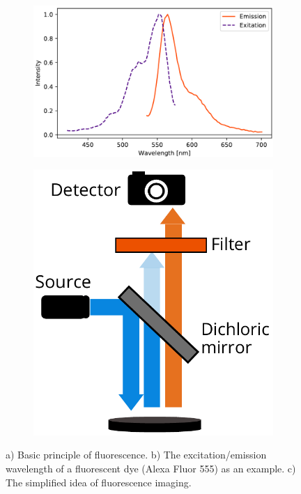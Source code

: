 \documentclass[final]{jyflluk}
\begin{document}
\begin{figure}[h]
    
    \vspace{1cm}
    \centering    
    \begin{subfigure}[t]{0.65\textwidth}
        \centering
        \includegraphics[width=\linewidth]{images/fluore.pdf} 
        \caption{} \label{fig:luo}
    \end{subfigure}
    \hfill
    \begin{subfigure}[t]{0.32\textwidth}
        \centering
        \includegraphics[width=\linewidth]{images/microsco.pdf} 
        \caption{} \label{fig:mic}
    \end{subfigure}
    \caption{a) Basic principle of fluorescence. b) The excitation/emission wavelength of a fluorescent dye (Alexa Fluor 555) as an example. c) The simplified idea of fluorescence imaging.} \label{fig:fluore}
\end{figure}
\end{document}
